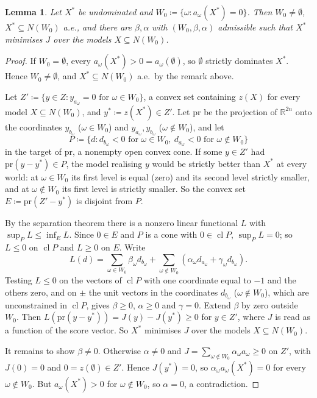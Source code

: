 \documentclass[11pt]{article}
\newcommand{\R}{\mathbb{R}}
\DeclareMathOperator{\cl}{cl}
\theoremstyle{plain}
\newtheorem{lemma}[theorem]{Lemma}
\theoremstyle{definition}
\theoremstyle{remark}
\begin{document}
\begin{lemma}\label{lem:sep}
Let $X^\ast$ be undominated and $W_0\coloneqq\{\omega:a_\omega(X^\ast)=0\}$. Then $W_0\neq
\emptyset$, $X^\ast\subseteq N(W_0)$ a.e., and there are $\beta,\alpha$ with
$(W_0,\beta,\alpha)$ admissible such that $X^\ast$ minimises $J$ over the models $X\subseteq
N(W_0)$.
\end{lemma}

\begin{proof}
If $W_0=\emptyset$, every $a_\omega(X^\ast)>0=a_\omega(\emptyset)$, so $\emptyset$ strictly
dominates $X^\ast$. Hence $W_0\neq\emptyset$, and $X^\ast\subseteq N(W_0)$ a.e.\ by the
remark above.

Let $Z'\coloneqq\{y\in Z:y_{a_\omega}=0\text{ for }\omega\in W_0\}$, a convex set
containing $z(X)$ for every model $X\subseteq N(W_0)$, and $y^\ast\coloneqq z(X^\ast)\in
Z'$. Let $\mathrm{pr}$ be the projection of $\R^{2n}$ onto the coordinates $y_{b_\omega}$
($\omega\in W_0$) and $y_{a_\omega},y_{b_\omega}$ ($\omega\notin W_0$), and let
\[
  P\coloneqq\{d:d_{b_\omega}<0\text{ for }\omega\in W_0,\ d_{a_\omega}<0\text{ for }
  \omega\notin W_0\}
\]
in the target of $\mathrm{pr}$, a nonempty open convex cone. If some $y\in Z'$ had
$\mathrm{pr}(y-y^\ast)\in P$, the model realising $y$ would be strictly better than
$X^\ast$ at every world: at $\omega\in W_0$ its first level is equal (zero) and its second
level strictly smaller, and at $\omega\notin W_0$ its first level is strictly smaller. So
the convex set $E\coloneqq\mathrm{pr}(Z'-y^\ast)$ is disjoint from $P$.

By the separation theorem \cite[Thm.~11.3]{Rockafellar} there is a nonzero linear
functional $L$ with $\sup_PL\le\inf_EL$. Since $0\in E$ and $P$ is a cone with $0\in\cl P$,
$\sup_PL=0$; so $L\le0$ on $\cl P$ and $L\ge0$ on $E$. Write
\[
  L(d)=\sum_{\omega\in W_0}\beta_\omega d_{b_\omega}+\sum_{\omega\notin W_0}
  (\alpha_\omega d_{a_\omega}+\gamma_\omega d_{b_\omega}).
\]
Testing $L\le0$ on the vectors of $\cl P$ with one coordinate equal to $-1$ and the others
zero, and on $\pm$ the unit vectors in the coordinates $d_{b_\omega}$ ($\omega\notin W_0$),
which are unconstrained in $\cl P$, gives $\beta\ge0$, $\alpha\ge0$ and $\gamma=0$. Extend
$\beta$ by zero outside $W_0$. Then $L(\mathrm{pr}(y-y^\ast))=J(y)-J(y^\ast)\ge0$ for $y\in
Z'$, where $J$ is read as a function of the score vector. So $X^\ast$ minimises $J$ over the
models $X\subseteq N(W_0)$.

It remains to show $\beta\neq0$. Otherwise $\alpha\neq0$ and $J=\sum_{\omega\notin W_0}
\alpha_\omega a_\omega\ge0$ on $Z'$, with $J(0)=0$ and $0=z(\emptyset)\in Z'$. Hence
$J(y^\ast)=0$, so $\alpha_\omega a_\omega(X^\ast)=0$ for every $\omega\notin W_0$. But
$a_\omega(X^\ast)>0$ for $\omega\notin W_0$, so $\alpha=0$, a contradiction.
\end{proof}
\end{document}
